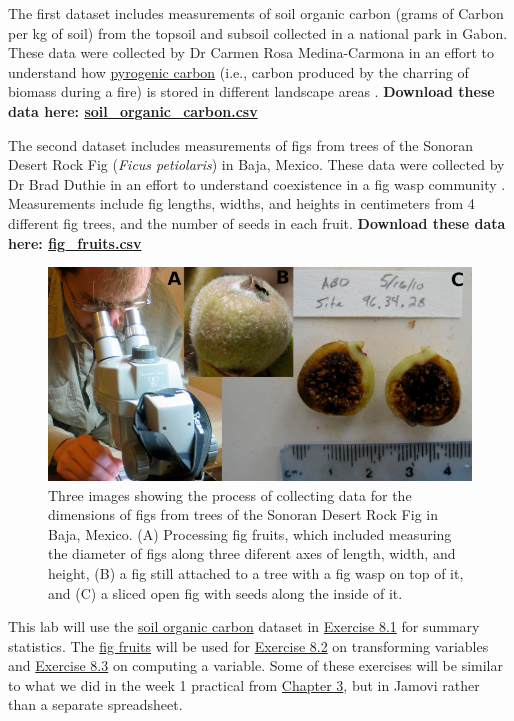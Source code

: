 \documentclass[
]{scrbook}
\begin{document}
The first dataset includes measurements of soil organic carbon (grams of Carbon per kg of soil) from the topsoil and subsoil collected in a national park in Gabon.
These data were collected by Dr Carmen Rosa Medina-Carmona in an effort to understand how \href{https://bg.copernicus.org/articles/3/397/2006/bg-3-397-2006.pdf}{pyrogenic carbon} (i.e., carbon produced by the charring of biomass during a fire) is stored in different landscape areas \citep{Santin2016, Preston2006}.
\textbf{Download these data here: \href{https://raw.githubusercontent.com/bradduthie/statistical_techniques/main/data/soil_organic_carbon.csv}{soil\_organic\_carbon.csv}}

The second dataset includes measurements of figs from trees of the Sonoran Desert Rock Fig (\emph{Ficus petiolaris}) in Baja, Mexico.
These data were collected by Dr Brad Duthie in an effort to understand coexistence in a fig wasp community \citep{Duthie2015b, Duthie2016}.
Measurements include fig lengths, widths, and heights in centimeters from 4 different fig trees, and the number of seeds in each fruit.
\textbf{Download these data here: \href{https://raw.githubusercontent.com/bradduthie/statistical_techniques/main/data/fig_fruits.csv}{fig\_fruits.csv}}

\begin{figure}
\includegraphics[width=1\linewidth]{img/fig_data_set} \caption{Three images showing the process of collecting data for the dimensions of figs from trees of the Sonoran Desert Rock Fig in Baja, Mexico. (A) Processing fig fruits, which included measuring the diameter of figs along three diferent axes of length, width, and height, (B) a fig still attached to a tree with a fig wasp on top of it, and (C) a sliced open fig with seeds along the inside of it.}\label{fig:unnamed-chunk-23}
\end{figure}

This lab will use the \href{https://raw.githubusercontent.com/bradduthie/statistical_techniques/main/data/soil_organic_carbon.csv}{soil organic carbon} dataset in \protect\hyperlink{02_summary_statistics}{Exercise 8.1} for summary statistics.
The \href{https://raw.githubusercontent.com/bradduthie/statistical_techniques/main/data/fig_fruits.csv}{fig fruits} will be used for \protect\hyperlink{02_transforming_variables}{Exercise 8.2} on transforming variables and \protect\hyperlink{02_computing_variables}{Exercise 8.3} on computing a variable.
Some of these exercises will be similar to what we did in the week 1 practical from \protect\hyperlink{ux5cux23Chapter_3}{Chapter 3}, but in Jamovi rather than a separate spreadsheet.
\end{document}
